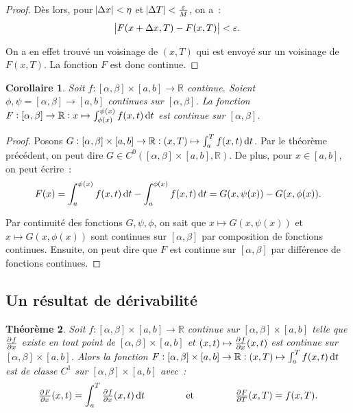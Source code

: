 \documentclass{report}
\newtheorem{thm}{Théorème}[chapter]
\newtheorem{cor}[thm]{Corollaire}
\theoremstyle{definition}
\theoremstyle{remark}
\numberwithin{equation}{section}
\newcommand{\R}{\mathbb R}
\begin{document}
\begin{proof}
			Dès lors, pour $\abs {\Delta x} < \eta$ et $\abs {\Delta T} < \frac \varepsilon M$, on a~:
			\begin{equation}
				\abs {F(x+\Delta x, T) - F(x, T)} < \varepsilon.
			\end{equation}

			On a en effet trouvé un voisinage de $(x, T)$ qui est envoyé sur un voisinage de $F(x, T)$. La fonction $F$ est donc continue.
			\end{proof}

			\begin{cor} Soit $f : [\alpha, \beta] \times [a, b] \to \R$ continue. Soient $\phi, \psi = [\alpha, \beta] \to [a, b]$ continues sur $[\alpha, \beta]$.
			La fonction $F : [\alpha, \beta] \to \R : x \mapsto \int_{\phi(x)}^{\psi(x)}f(x, t)\dif t$ est continue sur $[\alpha, \beta]$.
			\end{cor}

			\begin{proof} Posons $G : [\alpha, \beta] \times [a, b] \to \R : (x, T) \mapsto \int_a^T f(x, t)\dif t$. Par le théorème précédent, on peut dire
			$G \in C^0([\alpha, \beta] \times [a, b], \R)$. De plus, pour $x \in [a, b]$, on peut écrire~:
			\begin{equation}
				F(x) = \int_a^{\psi(x)}f(x, t)\dif t - \int_a^{\phi(x)}f(x, t)\dif t = G(x, \psi(x)) - G(x, \phi(x)).
			\end{equation}

			Par continuité des fonctions $G, \psi, \phi$, on sait que $x \mapsto G(x, \psi(x))$ et $x \mapsto G(x, \phi(x))$ sont continues sur $[\alpha, \beta]$
			par composition de fonctions continues. Ensuite, on peut dire que $F$ est continue sur $[\alpha, \beta]$ par différence de fonctions continues.
			\end{proof}

		\subsection{Un résultat de dérivabilité}
			\begin{thm}\label{thm:dérivabilitésegmentvariable} Soit $f : [\alpha, \beta] \times [a, b] \to \R$ continue sur $[\alpha, \beta] \times [a, b]$
			telle que $\pd fx$ existe en tout point de $[\alpha, \beta] \times [a, b]$ et $(x, t) \mapsto \pd fx(x, t)$ est continue sur
			$[\alpha, \beta] \times [a, b]$. Alors la fonction $F : [\alpha, \beta] \times [a, b] \to \R : (x, T) \mapsto \int_a^Tf(x, t)\dif t$ est de classe
			$C^1$ sur $[\alpha, \beta] \times [a, b]$ avec~:
			\begin{equation}
				\pd Fx(x, t) = \int_a^T\pd fx(x, t)\dif t \qquad\qquad\text{ et }\qquad\qquad \pd FT(x, T) = f(x, T).
			\end{equation}
			\end{thm}
\end{document}
